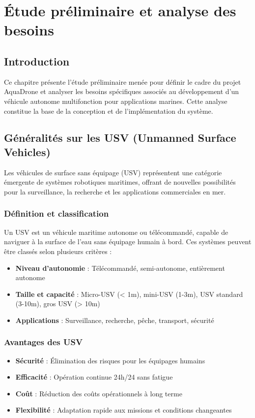\chapter[Étude préliminaire et analyse des besoins]{Étude préliminaire et analyse des besoins}
\label{cp:etude-preliminaire}

{
\parindent0pt

\section{Introduction}
Ce chapitre présente l'étude préliminaire menée pour définir le cadre du projet AquaDrone et analyser les besoins spécifiques associés au développement d'un véhicule autonome multifonction pour applications marines. Cette analyse constitue la base de la conception et de l'implémentation du système.

\section{Généralités sur les USV (Unmanned Surface Vehicles)}
Les véhicules de surface sans équipage (USV) représentent une catégorie émergente de systèmes robotiques maritimes, offrant de nouvelles possibilités pour la surveillance, la recherche et les applications commerciales en mer.

\subsection{Définition et classification}
Un USV est un véhicule maritime autonome ou télécommandé, capable de naviguer à la surface de l'eau sans équipage humain à bord. Ces systèmes peuvent être classés selon plusieurs critères :
\begin{itemize}
    \item \textbf{Niveau d'autonomie} : Télécommandé, semi-autonome, entièrement autonome
    \item \textbf{Taille et capacité} : Micro-USV (< 1m), mini-USV (1-3m), USV standard (3-10m), gros USV (> 10m)
    \item \textbf{Applications} : Surveillance, recherche, pêche, transport, sécurité
\end{itemize}

\subsection{Avantages des USV}
\begin{itemize}
    \item \textbf{Sécurité} : Élimination des risques pour les équipages humains
    \item \textbf{Efficacité} : Opération continue 24h/24 sans fatigue
    \item \textbf{Coût} : Réduction des coûts opérationnels à long terme
    \item \textbf{Flexibilité} : Adaptation rapide aux missions et conditions changeantes
\end{itemize}

}
